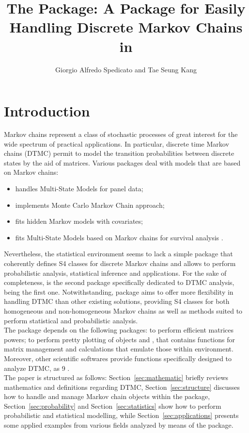 \documentclass[nojss]{jss}
\author{Giorgio Alfredo Spedicato and Tae Seung Kang}
\title{The \pkg{markovchain} Package: A Package for Easily Handling Discrete
Markov Chains in \proglang{R}}
\begin{document}



\maketitle

\section{Introduction}
Markov chains represent a class of stochastic processes of great interest for the wide spectrum of practical applications.
In particular, discrete time Markov chains (DTMC) permit to model the transition probabilities between discrete states by the aid of matrices.
Various  packages deal with models that are based on Markov chains:
\begin{itemize}
\item {} \citep{msmR} handles Multi-State Models for panel data;
\item {} \citep{mcmcR} implements Monte Carlo Markov Chain approach;  \item {} \citep{hmmR} fits hidden Markov models with covariates;
\item {} fits 
Multi-State Models based on Markov chains for survival analysis \citep{mstateR}.
\end{itemize}
Nevertheless, the  statistical environment \citep{rSoftware} seems to lack a simple package that coherently defines S4 classes for discrete Markov chains and allows to perform probabilistic analysis, statistical inference and
applications. For the sake of completeness,  is the second package specifically dedicated to DTMC analysis, being  \citep{DTMCPackR} the first one. Notwithstanding,  package \citep{markovchainR} aims to offer
more flexibility in handling DTMC than other existing
solutions, providing S4 classes for both homogeneous and non-homogeneous Markov chains as well as methods suited to perform statistical and probabilistic analysis.\\
The  package depends on the following  packages:  \citep{expmR} to perform efficient matrices powers;  \citep{pkg:igraph} to perform pretty plotting of  objects and  \citep{pkg:matlab}, that contains functions for matrix management and calculations that emulate those within  environment.
Moreover, other scientific softwares provide functions specifically designed
to analyze DTMC, as  9 \citep{mathematica9}.\\
The paper is structured as follows:
Section~\ref{sec:mathematic} briefly reviews mathematics and 
definitions regarding DTMC, Section~\ref{sec:structure}
discusses how to handle and manage Markov chain objects within the package,
Section~\ref{sec:probability} and Section~\ref{sec:statistics} show how to
perform probabilistic and statistical modelling, while
Section~\ref{sec:applications} presents some applied examples from various
fields analyzed by means of the  package.
\end{document}
